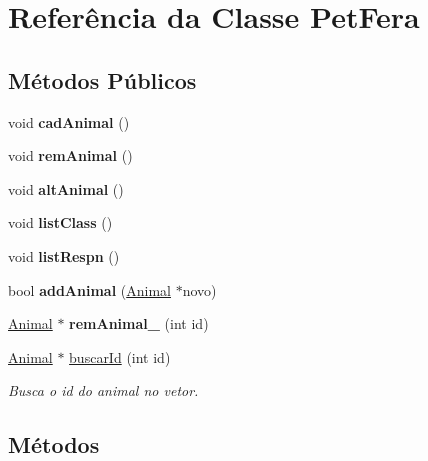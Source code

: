 \hypertarget{classPetFera}{}\section{Referência da Classe Pet\+Fera}
\label{classPetFera}
\subsection*{Métodos Públicos}
\begin{DoxyCompactItemize}
\item 
\mbox{\label{classPetFera_a5ba6438da07b3fbd4d3001f5abf40c67}} 
void {\bfseries cad\+Animal} ()
\item 
\mbox{\label{classPetFera_ab9a44d9cb270ba9a09bb2a28b96ca9ed}} 
void {\bfseries rem\+Animal} ()
\item 
\mbox{\label{classPetFera_aaf345645dfba2a1708c3fa0323f4d0df}} 
void {\bfseries alt\+Animal} ()
\item 
\mbox{\label{classPetFera_aae0ce5fef39f24927391bb2f6fa4507d}} 
void {\bfseries list\+Class} ()
\item 
\mbox{\label{classPetFera_a54125918fac61cbdea39700a7a8b2f27}} 
void {\bfseries list\+Respn} ()
\item 
\mbox{\label{classPetFera_ac81fbaa6dd89a2710d4d540ed263dffb}} 
bool {\bfseries add\+Animal} (\hyperlink{classAnimal}{Animal} $\ast$novo)
\item 
\mbox{\label{classPetFera_ad244e4520faeed187a19c16d14f06eae}} 
\hyperlink{classAnimal}{Animal} $\ast$ {\bfseries rem\+Animal\+\_\+} (int id)
\item 
\hyperlink{classAnimal}{Animal} $\ast$ \hyperlink{classPetFera_aece4ba2995cef4c6e02be5be3d9809fc}{buscar\+Id} (int id)
\begin{DoxyCompactList}\small\item\em Busca o id do animal no vetor. \end{DoxyCompactList}\end{DoxyCompactItemize}


\subsection{Métodos}
\mbox{\label{classPetFera_aece4ba2995cef4c6e02be5be3d9809fc}} 
